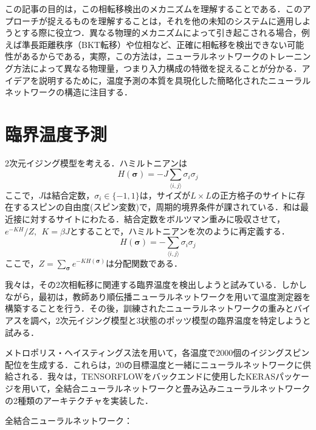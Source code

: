\documentclass[a4paper,11pt]{jsarticle}
\begin{document}
この記事の目的は，この相転移検出のメカニズムを理解することである．このアプローチが捉えるものを理解することは，それを他の未知のシステムに適用しようとする際に役立つ．異なる物理的メカニズムによって引き起こされる場合，例えば準長距離秩序（BKT転移）や位相など、正確に相転移を検出できない可能性があるからである，実際，この方法は，ニューラルネットワークのトレーニング方法によって異なる物理量，つまり入力構成の特徴を捉えることが分かる．アイデアを説明するために，温度予測の本質を具現化した簡略化されたニューラルネットワークの構造に注目する．

\section{臨界温度予測}
2次元イジング模型を考える．ハミルトニアンは
\begin{equation*}
  H(\bm{\sigma}) = - J \sum_{\langle i,j \rangle} \sigma_i \sigma_j
\end{equation*}
ここで，$J$は結合定数，$\sigma_i \in \{ -1, 1 \}$は，サイズが$L \times L$の正方格子のサイトに存在するスピンの自由度(スピン変数)で，周期的境界条件が課されている．和は最近接に対するサイトにわたる．結合定数をボルツマン重みに吸収させて，$e^{-KH}/Z, \ \ K = \beta J$とすることで，ハミルトニアンを次のように再定義する．
\begin{equation}
  H(\bm{\sigma}) = - \sum_{\langle i,j \rangle} \sigma_i \sigma_j
\end{equation}
ここで，$Z = \sum_{\bm{\sigma}}e^{-KH(\bm{\sigma})}$は分配関数である．\par
我々は，その2次相転移に関連する臨界温度を検出しようと試みている．しかしながら，最初は，教師あり順伝播ニューラルネットワークを用いて温度測定器を構築することを行う．その後，訓練されたニューラルネットワークの重みとバイアスを調べ，2次元イジング模型と3状態のポッツ模型の臨界温度を特定しようと試みる．\par
メトロポリス・ヘイスティングス法を用いて，各温度で2000個のイジングスピン配位を生成する．これらは，20の目標温度と一緒にニューラルネットワークに供給される．我々は，TENSORFLOWをバックエンドに使用したKERASパッケージを用いて，全結合ニューラルネットワークと畳み込みニューラルネットワークの2種類のアーキテクチャを実装した．\par
全結合ニューラルネットワーク：
\end{document}
